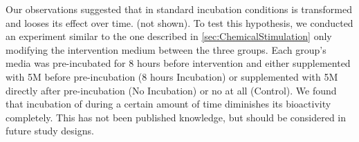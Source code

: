 Our observations suggested that in standard incubation conditions \Yoda{} is transformed and looses its effect over time. (not shown). To test this hypothesis, we conducted an experiment similar to the one described in \ref{sec:ChemicalStimulation} only modifying the intervention medium between the three groups. Each group's media was pre-incubated for 8 hours before intervention and either supplemented with 5\textmu{}M \Yoda{} before pre-incubation (8 hours Incubation) or supplemented with 5\textmu{}M \Yoda{} directly after pre-incubation (No Incubation) or no \Yoda{} at all (Control). We found that incubation of \Yoda{} during a certain amount of time diminishes its bioactivity completely. This has not been published knowledge, but should be considered in future study designs.

